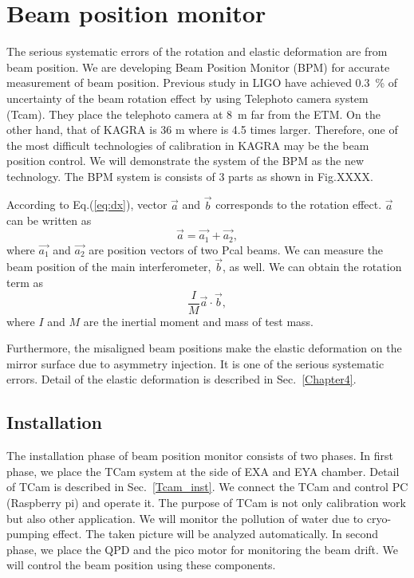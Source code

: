 
\chapter{Beam position monitor} %

\label{Chapter6} %
The serious systematic errors of the rotation and elastic deformation are from beam position.
We are developing Beam Position Monitor (BPM) for accurate measurement of beam position.
Previous study in LIGO have achieved 0.3~\% of uncertainty of the beam rotation effect by using Telephoto camera system (Tcam).
They place the telephoto camera at 8~m far from the ETM. On the other hand, that of KAGRA is 36 m where is 4.5 times larger. Therefore, one of the most difficult technologies of calibration in KAGRA may be the beam position control.
We will demonstrate the system of the BPM as  the new technology. The BPM system is consists of 3 parts as shown in Fig.XXXX.

According to Eq.(\ref{eq:dx}), vector $\vec{a}$ and $\vec{b}$ corresponds to the rotation effect. $\vec{a}$ can be written as
\begin{equation}
\vec{a}=\vec{a_1} + \vec{a_2},
\end{equation}
where $\vec{a_1}$ and $\vec{a_2}$ are position vectors of two Pcal beams. We can measure the beam position of the main interferometer, $\vec{b}$, as well.
We can obtain the rotation term as
\begin{equation}
\frac{I}{M}\vec{a} \cdot \vec{b},
\end{equation}
where $I$ and $M$ are the inertial moment and mass of test mass.

Furthermore, the misaligned beam positions make the elastic deformation on the mirror surface due to asymmetry injection. It is one of the serious systematic errors.
Detail of the elastic deformation is described in Sec.~\ref{Chapter4}.

\section{Installation}
The installation phase of beam position monitor consists of two phases.
In first phase, we place the TCam system at the side of EXA and EYA chamber.
Detail of TCam is described in Sec.~\ref{Tcam_inst}. We connect the TCam and control PC (Raspberry pi) and operate it.
The purpose of TCam is not only calibration work but also other application.
We will monitor the pollution of water due to cryo-pumping effect. The taken picture will be analyzed automatically.
In second phase, we place the QPD and the pico motor for monitoring the beam drift. We will control the beam position using these components.
